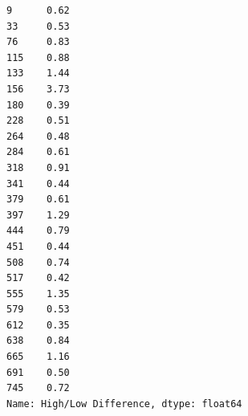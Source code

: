 \documentclass[11pt]{article}
\begin{document}
    \begin{Verbatim}[commandchars=\\\{\}]
9      0.62
33     0.53
76     0.83
115    0.88
133    1.44
156    3.73
180    0.39
228    0.51
264    0.48
284    0.61
318    0.91
341    0.44
379    0.61
397    1.29
444    0.79
451    0.44
508    0.74
517    0.42
555    1.35
579    0.53
612    0.35
638    0.84
665    1.16
691    0.50
745    0.72
Name: High/Low Difference, dtype: float64
    \end{Verbatim}


    
    
    
\end{document}
